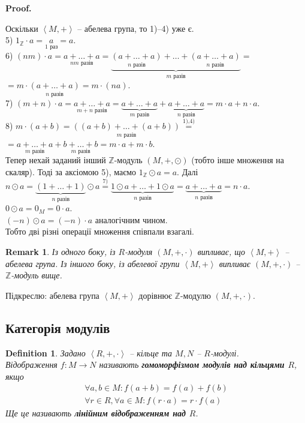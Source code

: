 \documentclass[a4paper, 10pt]{article}
\makeatletter
\theoremstyle{theoremdd}
\theoremstyle{theoremdd}
\newtheorem{definition}[theorem]{Definition}
\theoremstyle{theoremdd}
\theoremstyle{theoremdd}
\theoremstyle{theoremdd}
\theoremstyle{theoremdd}
\theoremstyle{theoremdd}
\theoremstyle{theoremdd}
\theoremstyle{theoremdd}
\theoremstyle{theoremdd}
\theoremstyle{theoremdd}
\newtheorem{remark}[theorem]{Remark}
\theoremstyle{theoremdd}
\theoremstyle{theoremdd}
\theoremstyle{theoremdd}
\theoremstyle{theoremdd}
\renewenvironment{proof}[1][Proof.\\]{\par
\pushQED{\hfill \qed}%
\normalfont \topsep6\p@\@plus6\p@\relax
\trivlist
\item\relax
{\bfseries
#1\@addpunct{.}}\hspace\labelsep\ignorespaces
}{%
\popQED\endtrivlist\@endpefalse
}
\makeatother
\begin{document}
\begin{proof}
Оскільки $\left< M,+\right>$ -- абелева група, то 1)--4) уже є.\\
5) $1_\mathbb{Z} \cdot a = \underset{1 \text{ раз}}{a} = a$.\\
6) $(nm) \cdot a = \underset{nm \text{ разів}}{a+\dots+a} = \underbrace{\underset{n\text{ разів}}{(a+\dots+a)} + \dots + \underset{n\text{ разів}}{(a+\dots+a)}}_{m \text{ разів}} =$ \\
$= m \cdot \underset{n\text{ разів}}{(a+\dots+a)} = m \cdot (na)$. \\
7) $(m+n) \cdot a = \underset{m+n\text{ разів}}{a + \dots + a} = \underbrace{a + \dots + a}_{m\text{ разів}} + \underbrace{a + \dots + a}_{n\text{ разів}} = m \cdot a + n \cdot a$. \\
8) $m \cdot (a + b) = \underset{m \text{ разів}}{((a+b) + \dots + (a+b))} \overset{\text{1),4)}}{=}$ \\
$= \underset{m\text{ разів}}{a + \dots + a} + \underset{m\text{ разів}}{b + \dots + b} = m \cdot a + m \cdot b$.
\bigskip \\
Тепер нехай заданий інший $\mathbb{Z}$-модуль $(M,+,\odot)$ (тобто інше множення на скаляр). Тоді за аксіомою 5), маємо $1_\mathbb{Z} \odot a = a$. Далі\\
$n \odot a = \underbrace{(1 + \dots + 1)}_{n \text{ разів}} \odot a \overset{7)}{=} \underbrace{1 \odot a + \dots + 1 \odot a}_{n\text{ разів}} = \underbrace{a+\dots+a}_{n \text{ разів}} = n \cdot a$.\\
$0 \odot a = 0_M = 0 \cdot a$.\\
$(-n) \odot a = (-n) \cdot a$ аналогічним чином.\\
Тобто дві різні операції множення співпали взагалі.
\end{proof}

\begin{remark}
Із одного боку, із $R$-модуля $(M,+,\cdot)$ випливає, що $\left<M,+\right>$ -- абелева група. Із іншого боку, із абелевої групи $\left<M,+\right>$ випливає $(M,+,\cdot)$ -- $\mathbb{Z}$-модуль вище.
\end{remark}

Підкреслю: абелева група $\left< M, +\right>$ дорівнює $\mathbb{Z}$-модулю $(M,+,\cdot)$.

\subsection{Категорія модулів}
\begin{definition}
Задано $\left< R,+,\cdot\right>$ -- кільце та $M,N$ -- $R$-модулі.\\
Відображення $f \colon M \to N$ називають \textbf{гомоморфізмом модулів над кільцями $R$}, якщо
\begin{align*}
\forall a,b \in M: f(a+b) = f(a) + f(b) \\
\forall r \in R, \forall a \in M: f(r \cdot a) = r \cdot f(a)
\end{align*}
Ще це називають \textbf{лінійним відображенням над $R$}.
\end{definition}
\end{document}
